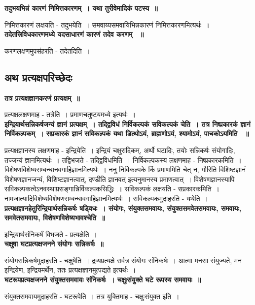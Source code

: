 	{\bfseries तदुभयभिन्नं कारणं निमित्तकारणम्~। यथा तुरीवेमादिकं पटस्य~॥}\par
		निमित्तकारणं लक्षयति - तदुभयेति~। समवाय्यसमवायिभिन्नकारणं निमित्तकारणमित्यर्थः~।\\[10pt]
	{\bfseries तदेतत्त्रिविधकारणमध्ये यदसाधारणं कारणं तदेव करणम् ~॥}\par
		करणलक्षणमुपसंहरति - तदेतदिति~। \subsection*{अथ प्रत्यक्षपरिच्छेदः}
	{\bfseries तत्र प्रत्यक्षज्ञानकरणं प्रत्यक्षम्~॥}\par
		प्रत्यक्षलक्षणमाह - तत्रेति~। प्रमाणचतुष्टयमध्ये इत्यर्थः~।\\[10pt]
	{\bfseries इन्द्रियार्थसन्निकर्षजन्यं ज्ञानं प्रत्यक्षम्~। तद्द्विविधं निर्विकल्पकं सविकल्पकं चेति~। तत्र निष्प्रकारकं ज्ञानं निर्विकल्पकम्~। सप्रकारकं ज्ञानं सविकल्पकं यथा डित्थोऽयं, ब्राह्मणोऽयं, श्यामोऽयं, पाचकोऽयमिति ~॥}\par
		प्रत्यक्षज्ञानस्य लक्षणमाह - इन्द्रियेति~। इन्द्रियं चक्षुरादिकम्, अर्थो घटादिः, तयोः सन्निकर्षः संयोगादिः, तज्जन्यं ज्ञानमित्यर्थः~। तद्विभजते - तद्द्विविधमिति~। निर्विकल्पकस्य लक्षणमाह - निष्प्रकारकमिति~। विशेषणविशेष्यसम्बन्धानवगाहिज्ञानमित्यर्थः~। ननु निर्विकल्पके किं प्रमाणमिति चेत् न, गौरिति विशिष्टज्ञानं विशेषणज्ञानजन्यं, विशिष्टज्ञानत्वात्, दण्डीति ज्ञानवत् इत्यनुमानस्य प्रमाणत्वात्~। विशेषणज्ञानस्यापि सविकल्पकत्वेऽनवस्थाप्रसङ्गान्निर्विकल्पकसिद्धिः~। सविकल्पकं लक्षयति - सप्रकारकमिति~। नामजात्यादिविशेष्यविशेषणसम्बन्धावगाहिज्ञानमित्यर्थः~। सविकल्पकमुदाहरति - यथेति~।\\[10pt]
	{\bfseries प्रत्यक्षज्ञानहेतुरिन्द्रियार्थसन्निकर्षः षड्विधः~। संयोगः, संयुक्तसमवायः, संयुक्तसमवेतसमवायः, समवायः, समवेतसमवायः, विशेषणविशेष्यभावश्चेति~॥}\par
		इन्द्रियार्थसंनिकर्षं विभजते - प्रत्यक्षेति~।\\[10pt]
	{\bfseries चक्षुषा घटप्रत्यक्षजनने संयोगः सन्निकर्षः~॥}\par
		संयोगसन्निकर्षमुदाहरति - चक्षुषेति~। द्रव्यप्रत्यक्षे सर्वत्र संयोगः संनिकर्षः~। आत्मा मनसा संयुज्यते, मन इन्द्रियेण, इन्द्रियमर्थेन, ततः प्रत्यक्षज्ञानमुत्पद्यते इत्यर्थः~।\\[10pt]
	{\bfseries घटरूपप्रत्यक्षजनने संयुक्तसमवायः संनिकर्षः~। चक्षुःसंयुक्ते घटे रूपस्य समवायः~॥}\par
		संयुक्तसमवायमुदाहरति - घटरूपेति~। तत्र युक्तिमाह - चक्षुःसंयुक्त इति~।\\[10pt]
